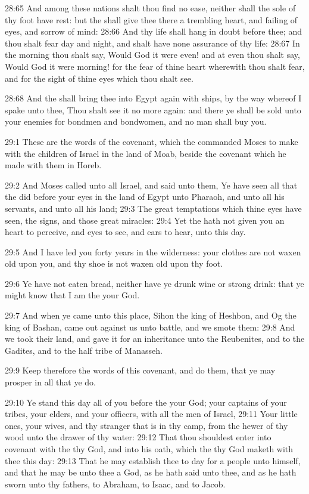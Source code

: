 28:65 And among these nations shalt thou find no ease, neither shall
the sole of thy foot have rest: but the \LORD shall give thee there a
trembling heart, and failing of eyes, and sorrow of mind: 28:66 And
thy life shall hang in doubt before thee; and thou shalt fear day and
night, and shalt have none assurance of thy life: 28:67 In the morning
thou shalt say, Would God it were even! and at even thou shalt say,
Would God it were morning! for the fear of thine heart wherewith thou
shalt fear, and for the sight of thine eyes which thou shalt see.

28:68 And the \LORD shall bring thee into Egypt again with ships, by
the way whereof I spake unto thee, Thou shalt see it no more again:
and there ye shall be sold unto your enemies for bondmen and
bondwomen, and no man shall buy you.

29:1 These are the words of the covenant, which the \LORD commanded
Moses to make with the children of Israel in the land of Moab, beside
the covenant which he made with them in Horeb.

29:2 And Moses called unto all Israel, and said unto them, Ye have
seen all that the \LORD did before your eyes in the land of Egypt unto
Pharaoh, and unto all his servants, and unto all his land; 29:3 The
great temptations which thine eyes have seen, the signs, and those
great miracles: 29:4 Yet the \LORD hath not given you an heart to
perceive, and eyes to see, and ears to hear, unto this day.

29:5 And I have led you forty years in the wilderness: your clothes
are not waxen old upon you, and thy shoe is not waxen old upon thy
foot.

29:6 Ye have not eaten bread, neither have ye drunk wine or strong
drink: that ye might know that I am the \LORD your God.

29:7 And when ye came unto this place, Sihon the king of Heshbon, and
Og the king of Bashan, came out against us unto battle, and we smote
them: 29:8 And we took their land, and gave it for an inheritance unto
the Reubenites, and to the Gadites, and to the half tribe of Manasseh.

29:9 Keep therefore the words of this covenant, and do them, that ye
may prosper in all that ye do.

29:10 Ye stand this day all of you before the \LORD your God; your
captains of your tribes, your elders, and your officers, with all the
men of Israel, 29:11 Your little ones, your wives, and thy stranger
that is in thy camp, from the hewer of thy wood unto the drawer of thy
water: 29:12 That thou shouldest enter into covenant with the \LORD thy
God, and into his oath, which the \LORD thy God maketh with thee this
day: 29:13 That he may establish thee to day for a people unto
himself, and that he may be unto thee a God, as he hath said unto
thee, and as he hath sworn unto thy fathers, to Abraham, to Isaac, and
to Jacob.

